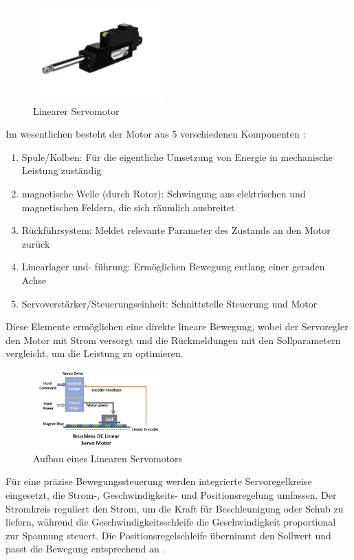 \begin{figure}[htbp]
	\centering
	\includegraphics[width=5cm]{img/LinServo}
	\caption{Linearer Servomotor \cite*{rei.ReicheltLinearerServomotor.}}
	\label{fig:Servomotor}
\end{figure}

Im wesentlichen besteht der Motor aus 5 verschiedenen Komponenten \cite*[vgl.][]{Linearer.Servo}:

\begin{enumerate}
	\item Spule/Kolben: Für die eigentliche Umsetzung von Energie in mechanische Leistung zuständig
	\item magnetische Welle (durch Rotor): Schwingung aus elektrischen und magnetischen Feldern, die sich räumlich ausbreitet
	\item Rückführsystem: Meldet relevante Parameter des Zustands an den Motor zurück
	\item Linearlager und- führung: Ermöglichen Bewegung entlang einer geraden Achse
	\item Servoverstärker/Steuerungseinheit: Schnittstelle Steuerung und Motor
\end{enumerate}

Diese Elemente ermöglichen eine direkte lineare Bewegung,
wobei der Servoregler den Motor mit Strom versorgt und die Rückmeldungen mit den Sollparametern vergleicht,
um die Leistung zu optimieren.

\begin{figure}[htbp]
	\centering
	\includegraphics[width=5cm]{img/BrushlessDCLin}
	\caption{Aufbau eines Linearen Servomotors \cite*{Linearer.Servo}}
	\label{fig:ServomotorAufbau}
\end{figure}

Für eine präzise Bewegungssteuerung werden integrierte Servoregelkreise eingesetzt, die Strom-, Geschwindigkeits- und
Positionsregelung umfassen. Der Stromkreis reguliert den Strom, um die Kraft für Beschleunigung oder Schub zu liefern,
während die Geschwindigkeitsschleife die Geschwindigkeit proportional zur Spannung steuert. Die Positionsregelschleife
übernimmt den Sollwert und passt die Bewegung entsprechend an \cite*[vgl.][]{Linearer.Servo}.

